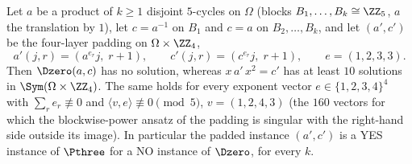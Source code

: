 
\begin{prop}\label{prop:fourlayer}
Let $a$ be a product of $k\ge1$ disjoint $5$-cycles on $\Omega$ (blocks $B_1,\dots,B_k\cong\ZZ_5$, $a$ the translation by $1$),
let $c=a^{-1}$ on $B_1$ and $c=a$ on $B_2,\dots,B_k$, and let $(a',c')$ be the four-layer padding on $\Omega\times\ZZ_4$,
\[
a'(j,r)=(a^{e_r}j,\;r+1),\qquad c'(j,r)=(c^{e_r}j,\;r+1),\qquad e=(1,2,3,3).
\]
Then $\Dzero(a,c)$ has no solution, whereas $x\,a'\,x^{2}=c'$ has at least $10$ solutions in $\Sym(\Omega\times\ZZ_4)$.
The same holds for every exponent vector $e\in\{1,2,3,4\}^{4}$ with $\sum_r e_r\not\equiv0$ and $\langle v,e\rangle\not\equiv0\pmod 5$,
$v=(1,2,4,3)$ (the $160$ vectors for which the blockwise-power ansatz of the padding is singular with the right-hand side outside its image).
In particular the padded instance $(a',c')$ is a YES instance of $\Pthree$ for a NO instance of $\Dzero$, for every $k$.
\end{prop}

